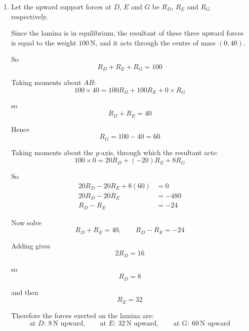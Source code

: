 \documentclass[leqno]{article}
\begin{document}
\begin{enumerate}[
  label=\textbf{\arabic*.},
  leftmargin=*,
  topsep=0pt,
  partopsep=0pt,
  parsep=0pt
]
\begin{djsSolution}
\begin{enumerate}[label=\textbf{(\alph*)}, start=1]
Now do the same for line \(EG\), where \(E(-20,100)\):
\[
\frac{40-0}{100-0}=\frac{x-p}{-20-p}
\]

Hence
\begin{align*}
\frac{2}{5}&=\frac{x-p}{-20-p}\\
x-p&=\frac{2}{5}(-20-p)\\
x&=-8+\frac{3p}{5}
\end{align*}

So at height \(y=40\), triangle \(DEG\) runs from
\[
x=-8+\frac{3p}{5}
\quad \text{to} \quad
x=8+\frac{3p}{5}
\]

For \((0,40)\) to lie on or between these values:
\[
-8+\frac{3p}{5}\le 0 \le 8+\frac{3p}{5}
\]

This gives
\[
p\le \frac{40}{3}
\qquad \text{and} \qquad
p\ge -\frac{40}{3}
\]

Therefore the required range is
\[
-\frac{40}{3}\le p\le \frac{40}{3}
\]

\item Let the upward support forces at \(D\), \(E\) and \(G\) be \(R_D\), \(R_E\) and \(R_G\) respectively.

Since the lamina is in equilibrium, the resultant of these three upward forces is equal to the weight \(100\,\mathrm{N}\), and it acts through the centre of mass \((0,40)\).

So
\[
R_D+R_E+R_G=100
\]

Taking moments about \(AB\):
\[
100\times 40=100R_D+100R_E+0\times R_G
\]

so
\[
R_D+R_E=40
\]

Hence
\[
R_G=100-40=60
\]

Taking moments about the \(y\)-axis, through which the resultant acts:
\[
100\times 0=20R_D+(-20)R_E+8R_G
\]

So
\begin{align*}
20R_D-20R_E+8(60)&=0\\
20R_D-20R_E&=-480\\
R_D-R_E&=-24
\end{align*}

Now solve
\[
R_D+R_E=40,
\qquad
R_D-R_E=-24
\]

Adding gives
\[
2R_D=16
\]

so
\[
R_D=8
\]

and then
\[
R_E=32
\]

Therefore the forces exerted on the lamina are:
\[
\text{at }D:\ 8\,\mathrm{N}\text{ upward},\qquad
\text{at }E:\ 32\,\mathrm{N}\text{ upward},\qquad
\text{at }G:\ 60\,\mathrm{N}\text{ upward}
\]
\end{enumerate}
\end{djsSolution}



\end{enumerate}
\end{document}
